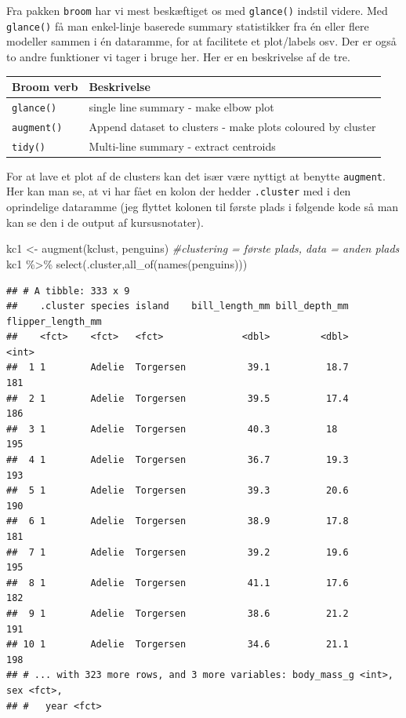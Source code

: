 \documentclass[
]{book}
\newenvironment{Shaded}{\begin{snugshade}}{\end{snugshade}}
\newcommand{\CommentTok}[1]{\textcolor[rgb]{0.56,0.35,0.01}{\textit{#1}}}
\newcommand{\FunctionTok}[1]{\textcolor[rgb]{0.00,0.00,0.00}{#1}}
\newcommand{\NormalTok}[1]{#1}
\newcommand{\OtherTok}[1]{\textcolor[rgb]{0.56,0.35,0.01}{#1}}
\newcommand{\SpecialCharTok}[1]{\textcolor[rgb]{0.00,0.00,0.00}{#1}}
\begin{document}
Fra pakken \texttt{broom} har vi mest beskæftiget os med \texttt{glance()} indstil videre. Med \texttt{glance()} få man enkel-linje baserede summary statistikker fra én eller flere modeller sammen i én dataramme, for at facilitete et plot/labels osv. Der er også to andre funktioner vi tager i bruge her. Her er en beskrivelse af de tre.

\begin{longtable}[]{@{}ll@{}}
\toprule
Broom verb & Beskrivelse \\
\midrule
\endhead
\texttt{glance()} & single line summary - make elbow plot \\
\texttt{augment()} & Append dataset to clusters - make plots coloured by cluster \\
\texttt{tidy()} & Multi-line summary - extract centroids \\
\bottomrule
\end{longtable}

For at lave et plot af de clusters kan det især være nyttigt at benytte \texttt{augment}. Her kan man se, at vi har fået en kolon der hedder \texttt{.cluster} med i den oprindelige dataramme (jeg flyttet kolonen til første plads i følgende kode så man kan se den i de output af kursusnotater).

\begin{Shaded}
\begin{Highlighting}[]
\NormalTok{kc1 }\OtherTok{\textless{}{-}} \FunctionTok{augment}\NormalTok{(kclust, penguins) }\CommentTok{\#clustering = første plads, data = anden plads}
\NormalTok{kc1 }\SpecialCharTok{\%\textgreater{}\%} \FunctionTok{select}\NormalTok{(.cluster,}\FunctionTok{all\_of}\NormalTok{(}\FunctionTok{names}\NormalTok{(penguins)))}
\end{Highlighting}
\end{Shaded}

\begin{verbatim}
## # A tibble: 333 x 9
##    .cluster species island    bill_length_mm bill_depth_mm flipper_length_mm
##    <fct>    <fct>   <fct>              <dbl>         <dbl>             <int>
##  1 1        Adelie  Torgersen           39.1          18.7               181
##  2 1        Adelie  Torgersen           39.5          17.4               186
##  3 1        Adelie  Torgersen           40.3          18                 195
##  4 1        Adelie  Torgersen           36.7          19.3               193
##  5 1        Adelie  Torgersen           39.3          20.6               190
##  6 1        Adelie  Torgersen           38.9          17.8               181
##  7 1        Adelie  Torgersen           39.2          19.6               195
##  8 1        Adelie  Torgersen           41.1          17.6               182
##  9 1        Adelie  Torgersen           38.6          21.2               191
## 10 1        Adelie  Torgersen           34.6          21.1               198
## # ... with 323 more rows, and 3 more variables: body_mass_g <int>, sex <fct>,
## #   year <fct>
\end{verbatim}
\end{document}
